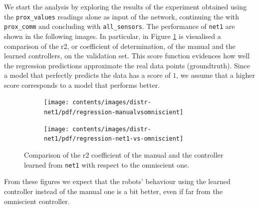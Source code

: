 We start the analysis by exploring the results of the experiment obtained 
using the \texttt{prox\_values} readings alone as input of the network, continuing 
the with \texttt{prox\_comm} and concluding with \texttt{all\_sensors}.
The performance of \texttt{net1} are shown in the following images. In particular,  
in Figure \ref{fig:net1r2} is visualised a comparison of the \gls{r2}, or coefficient 
of determination, of the manual and the learned controllers, on the validation set.
This score function evidences how well the regression predictions approximate 
the real data points (groundtruth). Since a model that perfectly predicts the data 
has a score of $1$, we assume that a higher score corresponds to a model that 
performs better.
\begin{figure}[!htb]
	\centering
	\begin{subfigure}[h]{0.49\textwidth}
		\centering
		\texttt{[image: contents/images/distr-net1/pdf/regression-manualvsomniscient]}%
	\end{subfigure}
	\hfill
	\begin{subfigure}[h]{0.49\textwidth}
		\centering
		\texttt{[image: contents/images/distr-net1/pdf/regression-net1-vs-omniscient]}
	\end{subfigure}
	\caption[Evaluation of the \gls{r2} coefficient of \texttt{net1} .]{Comparison of 
	the \gls{r2} coefficient of the manual and the controller learned from 
	\texttt{net1} with respect to the omniscient one.}
	\label{fig:net1r2}
\end{figure}
From these figures we expect that the robots' behaviour using the learned 
controller instead of the manual one is a bit better, even if far from the omniscient 
controller.

